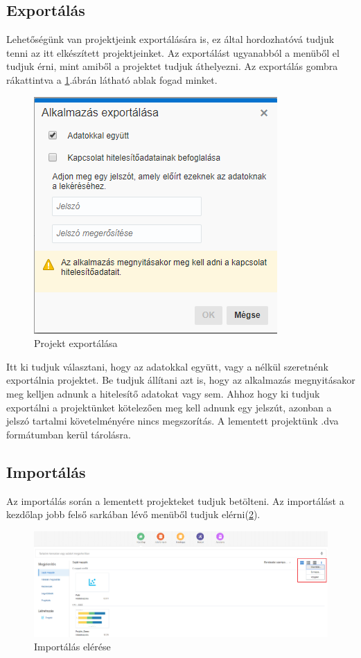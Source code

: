 \subsection{Exportálás}
Lehetőségünk van projektjeink exportálására is, ez által hordozhatóvá tudjuk tenni az itt elkészített projektjeinket. Az exportálást ugyanabból a menüből el tudjuk érni, mint amiből a projektet tudjuk áthelyezni. Az exportálás gombra rákattintva a \ref{fig:exportalas}.ábrán látható ablak fogad minket.

\begin{figure}[!h]
	\centering
	\includegraphics[width=0.7\linewidth]{matyi_imgs/exportalas}
	\caption[Projekt exportálása]{Projekt exportálása}
	\label{fig:exportalas}
\end{figure}

Itt ki tudjuk választani, hogy az adatokkal együtt, vagy a nélkül szeretnénk exportálnia  projektet. Be tudjuk állítani azt is, hogy az alkalmazás megnyitásakor meg kelljen adnunk a hitelesítő adatokat vagy sem. Ahhoz hogy ki tudjuk exportálni a projektünket kötelezően meg kell adnunk egy jelszút, azonban a jelszó tartalmi követelményére nincs megszorítás. A lementett projektünk .dva formátumban kerül tárolásra.

\pagebreak

\subsection{Importálás}
Az importálás során a lementett projekteket tudjuk betölteni. Az importálást a kezdőlap jobb felső sarkában lévő menüből tudjuk elérni(\ref{fig:importalas}).

\begin{figure}[!h]
	\centering
	\includegraphics[width=0.7\linewidth]{matyi_imgs/importalas}
	\caption[Importálás elérése]{Importálás elérése}
	\label{fig:importalas}
\end{figure}

